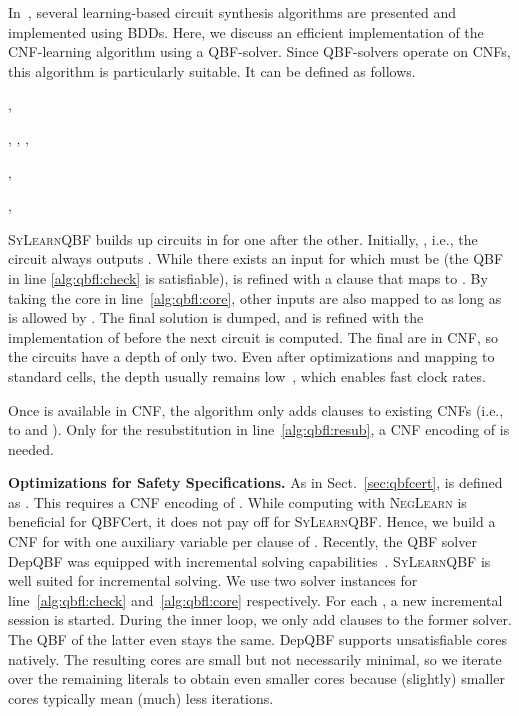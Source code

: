 \documentclass[conference]{IEEEtran}
\newcommand{\depqbf}{\textsf{DepQBF}\xspace}
\newcommand{\qbfcert}{\textsf{QBFCert}\xspace}
\begin{document}
In~\cite{EhlersKH12}, several learning-based circuit synthesis algorithms are 
presented and implemented using BDDs.  Here, we discuss an efficient 
implementation of the CNF-learning algorithm using a QBF-solver.  Since 
QBF-solvers operate on CNFs, this algorithm is particularly suitable.  It can be 
defined as follows.
\begin{algorithmic}[1]
  \State ,\;\; 
         
  \For{}
    \State ,\;
           ,\;
           ,\;
           
    \label{alg:qbfl:check}
      \State  \label{alg:qbfl:core}
      \State ,\;\;
             
    \EndWhile
    \State ,\;\;
            \label{alg:qbfl:resub}
  \EndFor
\EndProcedure
\end{algorithmic}
\textsc{SyLearnQBF} builds up circuits in  for one  
after the other.  Initially, , i.e., the circuit always outputs 
.  While there exists an input  for which  must be 
 (the QBF in line \ref{alg:qbfl:check} is satisfiable),  is refined 
with a clause that maps  to . By taking the core in 
line~\ref{alg:qbfl:core}, other inputs are also mapped to  as long as 
 is allowed by . The final solution  is dumped, and  is 
refined with the implementation of  before the next circuit is computed.  The 
final  are in CNF, so the circuits have a depth of only two.  Even after 
optimizations and mapping to standard cells, the depth usually remains 
low~\cite{EhlersKH12}, which enables fast clock rates.

Once  is available in CNF, the algorithm only adds clauses to existing 
CNFs (i.e., to  and ).  Only for the resubstitution in 
line~\ref{alg:qbfl:resub}, a CNF encoding of  is needed.

\textbf{Optimizations for Safety Specifications.}  As in 
Sect.~\ref{sec:qbfcert},  is defined as . 
This requires a CNF encoding of .  While computing  with 
\textsc{NegLearn} is beneficial for \qbfcert, it does not pay off for 
\textsc{SyLearnQBF}. Hence, we build a CNF for  with one auxiliary 
variable per clause of .  Recently, the QBF solver \depqbf was equipped 
with incremental solving capabilities~\cite{LonsingE14}. \textsc{SyLearnQBF} 
is well suited for incremental solving. We use two solver instances for 
line~\ref{alg:qbfl:check} and~\ref{alg:qbfl:core} respectively.  For each , a new incremental session is started.  During the inner loop, we 
only add clauses to the former solver. The QBF of the latter even stays the 
same.  \depqbf supports unsatisfiable cores natively.  The resulting cores are 
small but not necessarily minimal, so we iterate over the remaining literals to 
obtain even smaller cores because (slightly) smaller cores typically mean (much) 
less iterations.
\end{document}
